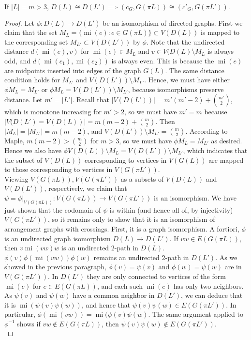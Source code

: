 \documentclass[11pt, oneside]{article}
\newcommand{\mi}{\operatorname{mi}}
\begin{document}
\begin{lem}\label{dirtograph}
If $|L|=m > 3$, $D(L) \cong D(L') \implies (c_G, G(\pi L))\cong (c'_G, G(\pi L'))$.
\end{lem}
\begin{proof}
Let $\phi: D(L) \to D(L')$ be an isomorphism of directed graphs. First we claim that the set $M_L = \{ \mi(e): e \in G( \pi L)\} \subset V(D(L))$ is mapped to the corresponding set $M_{L'} \subset V(D(L'))$ by $\phi$. 
Note that the undirected distance $d(\mi(e), v)$ for $\mi(e) \in M_L$ and $v \in V(D(L) \setminus M_L$ is always odd, and $d(\mi(e_1), \mi(e_2))$ is always even. 
This is because the $\mi(e)$ are midpoints inserted into edges of the graph $G(L)$. The same distance condition holds for $M_{L'}$ and $V(D(L')) \setminus M_{L'}$. Hence, we must have either $\phi M_{L} = M_{L'}$ or $\phi M_{L} = V(D(L')) \setminus M_{L'}$, because isomorphisms preserve distance.
 Let $m' = |L'|$. Recall that $|V(D(L'))| = m'(m'-2) + {m' \choose 2}$, which is monotone increasing for $m' > 2$, so we must have $m' = m$ because $|V(D(L') = V(D(L))| = m(m-2) + {m \choose 2}$. 
 Then $|M_L| = |M_{L'}|= m(m-2)$, and $V(D(L')) \setminus M_{L'} = {m \choose 2}$. According to Maple, $m(m-2) > { m \choose 2}$ for $m > 3$, so we must have $\phi M_{L} = M_{L'}$ as desired. 
 Hence we also have $\phi  V(D(L)) \setminus M_{L} = V(D(L')) \setminus M_{L'}$, which indicates that the subset of $V(D(L))$ corresponding to vertices in $V(G(L))$ are mapped to those corresponding to vertices in $V(G(\pi L'))$. \\

Viewing $V(G( \pi L)), V(G( \pi L'))$ as a subsets of $V(D(L))$ and $V(D(L'))$, respectively, we claim that $\psi = \phi|_{V(G(\pi L))}:V(G( \pi L)) \to V(G( \pi L'))$ is an isomorphism. 
We have just shown that the codomain of $\psi$ is within (and hence all of, by injectivity) $V(G(\pi L'))$, so it remains only to show that it is an isomorphism of arrangement graphs with crossings. First, it is a graph isomorphism. A fortiori, $\phi$ is an undirected graph isomorphism $D(L) \to D(L')$. If $vw \in E(G( \pi L))$, then $v\mi(vw)w$ is an undirected $2$-path in $D(L)$. 
$\phi(v) \phi(\mi (vw)) \phi (w)$ remains an undirected $2$-path in $D(L')$. As we showed in the previous paragraph, $\phi(v) = \psi(v)$ and $\phi(w)= \psi(w)$ are in $V(G( \pi L'))$. 
In $D(L')$ they are only connected to vertices of the form $\mi (e)$ for $e \in E(G(\pi L))$, and each such $\mi(e)$ has only two neighbors. As $\psi(v)$ and $\psi(w)$ have a common neighbor in $D(L')$, we can deduce that it is $\mi(\psi(v)\psi(w))$, and hence that $\psi(v)\psi(w) \in E(G(\pi L'))$. 
In particular, $\phi(\mi(vw)) = \mi(\psi(v) \psi(w)$. The same argument applied to $\phi^{-1}$ shows if $vw \notin E(G(\pi L))$, then $\psi(v)\psi(w) \notin E(G( \pi L'))$.\\


\end{proof}
\end{document}
